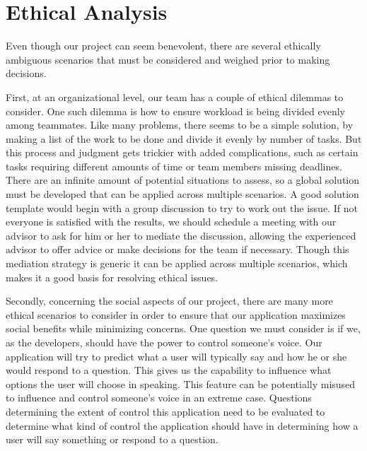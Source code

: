 \chapter{Ethical Analysis}

Even though our project can seem benevolent, there are several ethically ambiguous scenarios that must be considered and weighed prior to making decisions.


First, at an organizational level, our team has a couple of ethical dilemmas to consider. One such dilemma is how to ensure workload is being divided evenly among teammates. Like many problems, there seems to be a simple solution, by making a list of the work to be done and divide it evenly by number of tasks. But this process and judgment gets trickier with added complications, such as certain tasks requiring different amounts of time or team members missing deadlines. There are an infinite amount of potential situations to assess, so a global solution must be developed that can be applied across multiple scenarios. A good solution template would begin with a group discussion to try to work out the issue. If not everyone is satisfied with the results, we should schedule a meeting with our advisor to ask for him or her to mediate the discussion, allowing the experienced advisor to offer advice or make decisions for the team if necessary. Though this mediation strategy is generic it can be applied across multiple scenarios, which makes it a good basis for resolving ethical issues.


Secondly, concerning the social aspects of our project, there are many more ethical scenarios to consider in order to ensure that our application maximizes social benefits while minimizing concerns. One question we must consider is if we, as the developers, should have the power to control someone's voice. Our application will try to predict what a user will typically say and how he or she would respond to a question. This gives us the capability to influence what options the user will choose in speaking. This feature can be potentially misused to influence and control someone's voice in an extreme case. Questions determining the extent of control this application need to be evaluated to determine what kind of control the application should have in determining how a user will say something or respond to a question.


